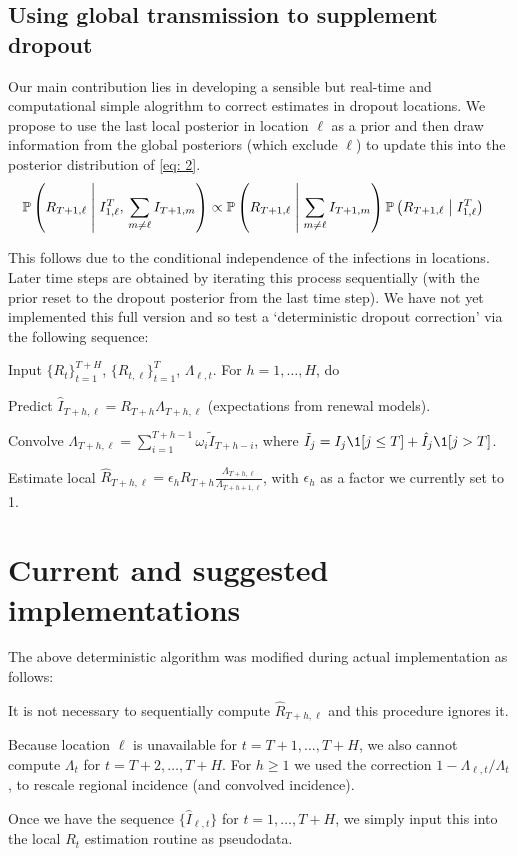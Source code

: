 \documentclass[12pt]{article}
\newcommand{\cond}{\; \m| \;}
\begin{document}
\subsection*{Using global transmission to supplement dropout}\label{sec:bayes}

Our main contribution lies in developing a sensible but real-time and computational simple alogrithm to correct estimates in dropout locations. We propose to use the last local posterior in location $\ell$ as a prior and then draw information from the global posteriors (which exclude $\ell$) to update this into the posterior distribution of \eqref{eq: 2}.
\begin{align}
& \mathbb{P}\left(R_{T+1, \ell} \cond I_{1, \ell}^T, \, \sum_{m \neq \ell} I_{T+1, m} \right) \propto \mathbb{P}\left(R_{T+1, \ell}  \cond \sum_{m \neq \ell} I_{T+1, m}\right)\mathbb{P}\left(R_{T+1, \ell}  \cond I_{1, \ell}^{T}\right)\label{eq: 2}
\end{align}


This follows due to the conditional independence of the infections in locations.
Later time steps are obtained by iterating this process sequentially (with the
prior reset to the dropout posterior from the last time step). We have not yet
implemented this full version and so test a `deterministic dropout correction'
via the following sequence:

Input $\{R_t\}_{t=1}^{T+H}$, $\{R_{t, \ell}\}_{t=1}^{T}$, $\Lambda_{\ell,t}$.
For $h = 1,\ldots,H$, do

\benum
\item Predict $\hat{I}_{T + h, \ell} = R_{T+h}\Lambda_{T+h, \ell}$ (expectations from renewal models).
\item Convolve $\Lambda_{T+h, \ell} = \sum_{i=1}^{T+h-1} \omega_{i}\tilde{I}_{T + h
- i}$, where $\tilde{I}_j = I_j \1[j\leq T] + \hat{I}_j \1[j>T]$.
\item Estimate local $\hat{R}_{T+h, \ell} = \epsilon_{h} R_{T+h} \frac{\Lambda_{T+h, \ell}}
{\Lambda_{T+h+1, \ell}}$, with $\epsilon_h$ as a factor we currently set to 1.
\eenum

\section*{Current and suggested implementations}\label{sec:implement}

The above deterministic algorithm was modified during actual implementation as
follows:

\bitem
\item It is not necessary to sequentially compute $\hat{R}_{T+h, \ell}$ and this
procedure ignores it. 
\item Because location $\ell$ is unavailable for $t=T+1,\ldots,T+H$, we also
cannot compute $\Lambda_t$ for $t=T+2,\ldots,T+H$. For $h \geq 1$ we used the
correction $1 - \Lambda_{\ell, t}/\Lambda_{t}$, to rescale regional incidence
(and convolved incidence).
\item Once we have the sequence $\{\hat{I}_{\ell, t}\}$ for $t=1,\ldots,T+H$, we
simply input this into the local $R_t$ estimation routine as pseudodata.
\eitem
\end{document}
